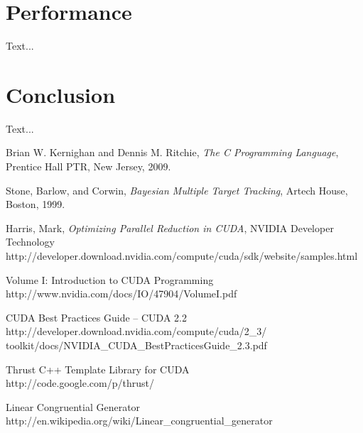 \documentclass{article}
\begin{document}
\section{Performance}
Text...

\section{Conclusion}
Text...

\begin{thebibliography}{9}

  Brian W. Kernighan and Dennis M. Ritchie,
  \emph{The C Programming Language},
  Prentice Hall PTR, New Jersey,
  2009.

  Stone, Barlow, and Corwin,
  \emph{Bayesian Multiple Target Tracking},
  Artech House, Boston,
  1999.

   Harris, Mark,
   \emph{Optimizing Parallel Reduction in CUDA},
   NVIDIA Developer Technology \\
   http://developer.download.nvidia.com/compute/cuda/sdk/website/samples.html

   Volume I: Introduction to CUDA Programming \\
   http://www.nvidia.com/docs/IO/47904/VolumeI.pdf

   CUDA Best Practices Guide -- CUDA 2.2\\
   http://developer.download.nvidia.com/compute/cuda/2\_3/\\
   toolkit/docs/NVIDIA\_CUDA\_BestPracticesGuide\_2.3.pdf

   Thrust C++ Template Library for CUDA \\
   http://code.google.com/p/thrust/

   Linear Congruential Generator \\
   http://en.wikipedia.org/wiki/Linear\_congruential\_generator

\end{thebibliography}
\end{document}
